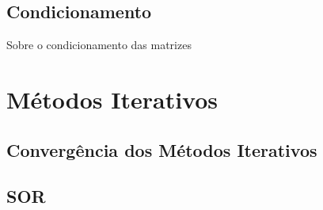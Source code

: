 \documentclass[a4paper]{article}
\begin{document}
\subsection{Condicionamento}
Sobre o condicionamento das matrizes



\bigskip

\section{Métodos Iterativos}

\subsection{Convergência dos Métodos Iterativos}

\subsection{SOR}




\bigskip
\end{document}

